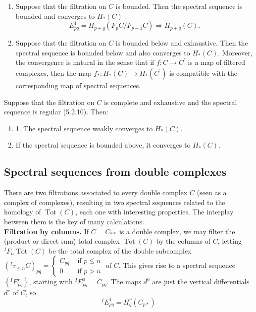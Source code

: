 \begin{example}
\begin{theo}
\begin{enumerate}
    \item Suppose that the filtration on $C$ is bounded. Then the spectral sequence is bounded and converges to $H_*(C)$ :
    $$
    E_{p q}^1=H_{p+q}\left(F_p C / F_{p-1} C\right) \Rightarrow H_{p+q}(C) .
    $$
    \item Suppose that the filtration on $C$ is bounded below and exhaustive. Then the spectral sequence is bounded below and also converges to $H_*(C)$.
    Moreover, the convergence is natural in the sense that if $f: C \rightarrow C^{\prime}$ is a map of filtered complexes, then the map $f_*: H_*(C) \rightarrow H_*\left(C^{\prime}\right)$ is compatible with the corresponding map of spectral sequences.
\end{enumerate}   
\end{theo}



\begin{theo}
Suppose that the filtration on $C$ is complete and exhaustive and the spectral sequence is regular (5.2.10). Then:
\begin{enumerate}
    \item 1. The spectral sequence weakly converges to $H_*(C)$.
    \item If the spectral sequence is bounded above, it converges to $H_*(C)$.
\end{enumerate}
\end{theo}

\subsection{Spectral sequences from double complexes}
There are two filtrations associated to every double complex $C$ (seen as a complex of complexes), resulting in two spectral sequences related to the homology of $\operatorname{Tot}(C)$, each one with interesting properties. The interplay between them is the key of many calculations.\\ %


\textbf{Filtration by columns.} If $C=C_{* *}$ is a double complex, we may filter the (product or direct sum) total complex $\operatorname{Tot}(C)$ by the columns of $C$, letting ${ }^I F_n \operatorname{Tot}(C)$ be the total complex of the double subcomplex $\left({ }^I \tau_{\leq n} C\right)_{p q}= \begin{cases}C_{p q} & \text { if } p \leq n \\ 0 & \text { if } p>n\end{cases}$ of $C$. This gives rise to a spectral sequence $\left\{{ }^I E_{p q}^r\right\}$, starting with ${ }^I E_{p q}^0=C_{p q}$. The maps $d^0$ are just the vertical differentials $d^v$ of $C$, so
$$
{ }^I E_{p q}^1=H_q^v\left(C_{p *}\right)
$$


\end{example}
